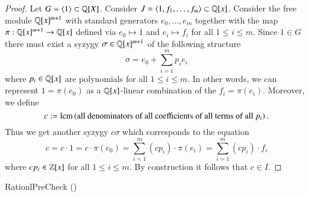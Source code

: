\begin{proof}
Let $G = \langle 1 \rangle \subset \mathbb{Q}[X]$. Consider $J = \langle 1, f_1,\ldots,
f_m\rangle \subset \mathbb{Q}[x]$. Consider the free module $\mathbb{Q}[x]^{m+1}$ with
standard generators $e_0,\ldots,e_m$ together
with the map $\pi: \mathbb{Q}[x]^{m+1} \rightarrow \mathbb{Q}[x]$ defined via $e_0 \mapsto
1$ and $e_i \mapsto f_i$ for all $1 \leq i \leq m$.
Since $1 \in G$ there must exist a syzygy $\sigma \in \mathbb{Q}[x]^{m+1}$ of the
following structure
\[ \sigma = e_0 + \sum_{i=1}^m p_i e_i\]
where $p_i \in \mathbb{Q}[x]$ are polynomials for all $1\leq i \leq m$.
In other words, we can represent $1 = \pi(e_0)$ as a $\mathbb{Q}[x]$-linear
combination of the $f_i = \pi(e_i)$. Moreover, we define
\[c := \operatorname{lcm}\left(\text{all denominators of all
coefficients of all terms of all $p_i$}\right).\]
Thus we get another syzygy $c\sigma$ which corresponds to the equation
\[c = c \cdot 1 = c \cdot \pi(e_0) =\sum_{i=1}^m (c p_i)\cdot \pi(e_i) =
\sum_{i=1}^m (c p_i) \cdot f_i\]
where $c p_i \in \mathbb{Z}[x]$ for all $1 \leq i \leq m$.
By construction it follows that $c \in I$.
\end{proof}

\begin{algorithm}
\caption{RationlPreCheck (\rpc)} 
\label{alg:rpc}
\begin{algorithmic}[1]
\EndIf
{}
\end{algorithmic}
\end{algorithm}

